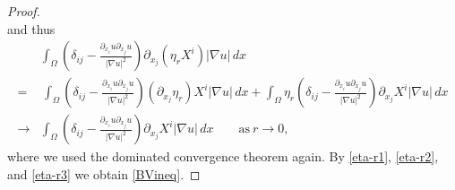 \documentclass[10pt,a4paper]{amsart}
\begin{document}
\begin{proof}
\begin{equation*}
\end{equation*}
and thus
\begin{equation}\label{eta-r3}
\begin{split}
&\int_{\Omega} \left( \delta_{ij} - \frac{ \partial_{x_i} u \partial _{x_j} u }{|\nabla u|^2} \right)
\partial_{x_j} (\eta_r X ^i) |\nabla u| \, dx \\
= & \, 
\int_{\Omega} \left( \delta_{ij} - \frac{ \partial_{x_i} u \partial _{x_j} u }{|\nabla u|^2} \right)
(\partial_{x_j} \eta_r) X ^i |\nabla u| \, dx
+
\int_{\Omega} \eta_r 
\left( \delta_{ij} - \frac{ \partial_{x_i} u \partial _{x_j} u }{|\nabla u|^2} \right)
\partial_{x_j} X ^i |\nabla u| \, dx \\
\to & 
\int_{\Omega} \left( \delta_{ij} - \frac{ \partial_{x_i} u \partial _{x_j} u }{|\nabla u|^2} \right)
\partial_{x_j} X ^i |\nabla u| \, dx \qquad \text{as} \ r\to 0,
\end{split}
\end{equation}
where we used the dominated convergence theorem again.
By \eqref{eta-r1}, \eqref{eta-r2}, and \eqref{eta-r3} we obtain \eqref{BVineq}.
\end{proof}
\end{document}
